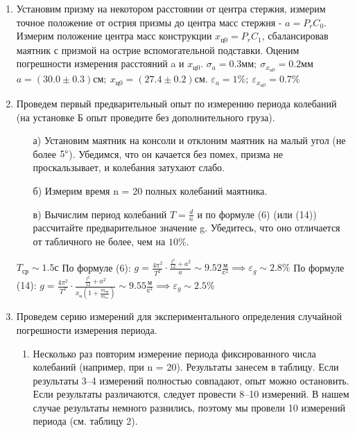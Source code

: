 \documentclass[a4paper,12pt]{article} %
\begin{document}
\begin{enumerate}
\item Установим призму на некотором расстоянии от центра стержня, измерим точное положение от острия призмы до центра масс
стержня - $a = P_rC_0$.
Измерим положение центра масс конструкции $x_{\text{ц0}} = P_rC_1$, сбалансировав маятник с призмой на острие вспомогательной подставки. Оценим погрешности измерения расстояний a и $x_{\text{ц0}}$.
$\sigma_a = 0.3\text{мм};\ \sigma_{x_{\text{ц0}}} = 0.2\text{мм}$
$a = (30.0 \pm 0.3)\text{см};\ x_{\text{ц0}} = (27.4 \pm 0.2)\text{см}.$
$\varepsilon_a = 1\%;\ \varepsilon_{x_{\text{ц0}}} = 0.7\%$

\item Проведем первый предварительный опыт по измерению периода колебаний (на установке Б опыт проведите без дополнительного груза).
\begin{enumerate}
	\item[а) ] Установим маятник на консоли и отклоним маятник на малый угол (не более $ 5 \degree $). Убедимся, что он качается без помех, призма не проскальзывает, и колебания затухают слабо.
	\item[б) ] Измерим время n = 20 полных колебаний маятника.
	\item[в) ] Вычислим период колебаний $T = \frac{d}{n}$ и по формуле (6) (или (14)) рассчитайте предварительное значение g. Убедитесь, что оно отличается от табличного не более, чем на $10\%$.
\end{enumerate}

$T_{\text{ср}} \sim 1.5 \text{с}$
По формуле (6): $g = \frac{4\pi^2}{T^2} \cdot \frac{\frac{l^2}{12} + a^2}{a} \sim 9.52 \frac{\text{м}}{\text{с}^2} \implies \varepsilon_g \sim 2.8\%$
По формуле (14): $g = \frac{4\pi^2}{T^2} \cdot \frac{\frac{l^2}{12} + a^2}{x_{\text{ц}}(1 + \frac{m_{\text{пр}}}{m_{\text{ст}}})} \sim 9.55 \frac{\text{м}}{\text{с}^2} \implies \varepsilon_g \sim 2.5\%$

\item Проведем серию измерений для экспериментального определения случайной погрешности измерения периода.
\begin{enumerate}

	\item Несколько раз повторим измерение периода фиксированного числа колебаний (например, при n = 20). Результаты занесем в таблицу. Если результаты 3–4 измерений полностью совпадают, опыт можно остановить. Если результаты
		различаются, следует провести 8–10 измерений.
		В нашем случае результаты немного разнились, поэтому мы провели 10 измерений периода (см. таблицу 2).


\end{enumerate}
\end{enumerate}
\end{document}
